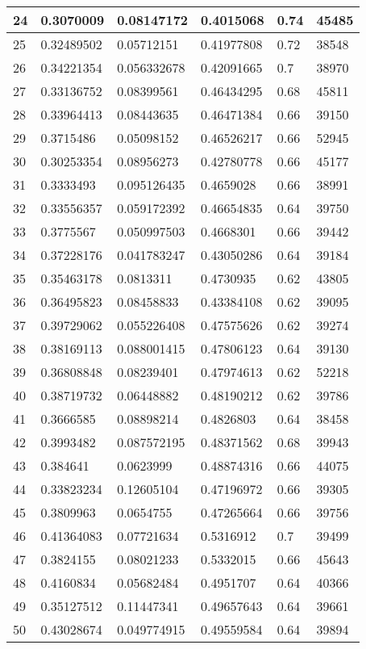 \begin{longtable}{|l|l|l|l|l|l|}
24 & 0.3070009 & 0.08147172 & 0.4015068 & 0.74 & 45485 \\ \hline 
25 & 0.32489502 & 0.05712151 & 0.41977808 & 0.72 & 38548 \\ \hline 
26 & 0.34221354 & 0.056332678 & 0.42091665 & 0.7 & 38970 \\ \hline 
27 & 0.33136752 & 0.08399561 & 0.46434295 & 0.68 & 45811 \\ \hline 
28 & 0.33964413 & 0.08443635 & 0.46471384 & 0.66 & 39150 \\ \hline 
29 & 0.3715486 & 0.05098152 & 0.46526217 & 0.66 & 52945 \\ \hline 
30 & 0.30253354 & 0.08956273 & 0.42780778 & 0.66 & 45177 \\ \hline 
31 & 0.3333493 & 0.095126435 & 0.4659028 & 0.66 & 38991 \\ \hline 
32 & 0.33556357 & 0.059172392 & 0.46654835 & 0.64 & 39750 \\ \hline 
33 & 0.3775567 & 0.050997503 & 0.4668301 & 0.66 & 39442 \\ \hline 
34 & 0.37228176 & 0.041783247 & 0.43050286 & 0.64 & 39184 \\ \hline 
35 & 0.35463178 & 0.0813311 & 0.4730935 & 0.62 & 43805 \\ \hline 
36 & 0.36495823 & 0.08458833 & 0.43384108 & 0.62 & 39095 \\ \hline 
37 & 0.39729062 & 0.055226408 & 0.47575626 & 0.62 & 39274 \\ \hline 
38 & 0.38169113 & 0.088001415 & 0.47806123 & 0.64 & 39130 \\ \hline 
39 & 0.36808848 & 0.08239401 & 0.47974613 & 0.62 & 52218 \\ \hline 
40 & 0.38719732 & 0.06448882 & 0.48190212 & 0.62 & 39786 \\ \hline 
41 & 0.3666585 & 0.08898214 & 0.4826803 & 0.64 & 38458 \\ \hline 
42 & 0.3993482 & 0.087572195 & 0.48371562 & 0.68 & 39943 \\ \hline 
43 & 0.384641 & 0.0623999 & 0.48874316 & 0.66 & 44075 \\ \hline 
44 & 0.33823234 & 0.12605104 & 0.47196972 & 0.66 & 39305 \\ \hline 
45 & 0.3809963 & 0.0654755 & 0.47265664 & 0.66 & 39756 \\ \hline 
46 & 0.41364083 & 0.07721634 & 0.5316912 & 0.7 & 39499 \\ \hline 
47 & 0.3824155 & 0.08021233 & 0.5332015 & 0.66 & 45643 \\ \hline 
48 & 0.4160834 & 0.05682484 & 0.4951707 & 0.64 & 40366 \\ \hline 
49 & 0.35127512 & 0.11447341 & 0.49657643 & 0.64 & 39661 \\ \hline 
50 & 0.43028674 & 0.049774915 & 0.49559584 & 0.64 & 39894 \\ \hline 
\end{longtable}